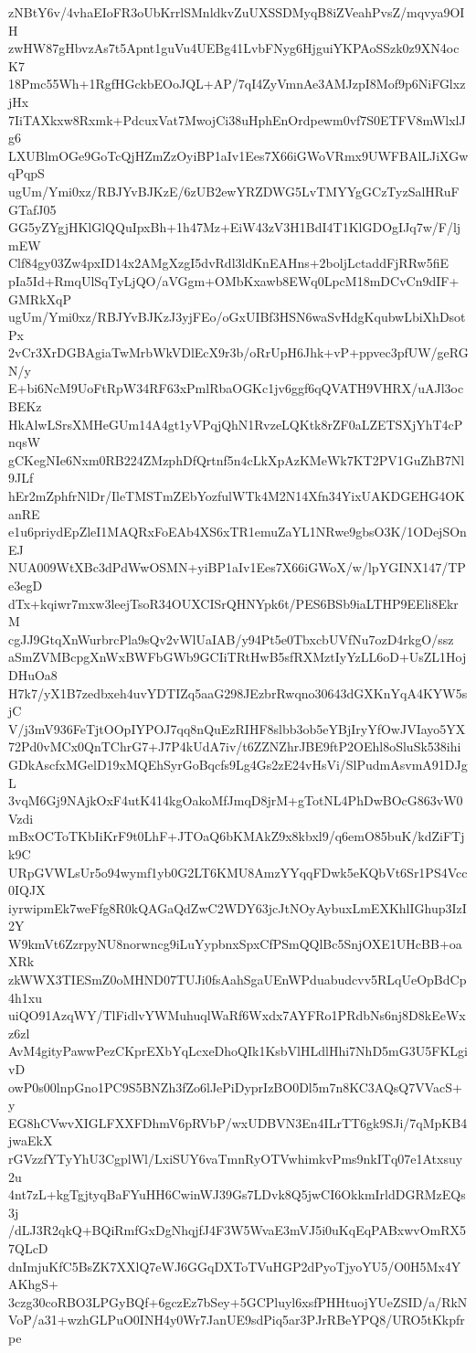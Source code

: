 zNBtY6v/4vhaEIoFR3oUbKrrlSMnldkvZuUXSSDMyqB8iZVeahPvsZ/mqvya9OIH
zwHW87gHbvzAs7t5Apnt1guVu4UEBg41LvbFNyg6HjguiYKPAoSSzk0z9XN4ocK7
18Pmc55Wh+1RgfHGckbEOoJQL+AP/7qI4ZyVmnAe3AMJzpI8Mof9p6NiFGlxzjHx
7IiTAXkxw8Rxmk+PdcuxVat7MwojCi38uHphEnOrdpewm0vf7S0ETFV8mWlxlJg6
LXUBlmOGe9GoTcQjHZmZzOyiBP1aIv1Ees7X66iGWoVRmx9UWFBAlLJiXGwqPqpS
ugUm/Ymi0xz/RBJYvBJKzE/6zUB2ewYRZDWG5LvTMYYgGCzTyzSalHRuFGTafJ05
GG5yZYgjHKlGlQQuIpxBh+1h47Mz+EiW43zV3H1BdI4T1KlGDOgIJq7w/F/ljmEW
Clf84gy03Zw4pxID14x2AMgXzgI5dvRdl3ldKnEAHns+2boljLctaddFjRRw5fiE
pIa5Id+RmqUlSqTyLjQO/aVGgm+OMbKxawb8EWq0LpcM18mDCvCn9dIF+GMRkXqP
ugUm/Ymi0xz/RBJYvBJKzJ3yjFEo/oGxUIBf3HSN6waSvHdgKqubwLbiXhDsotPx
2vCr3XrDGBAgiaTwMrbWkVDlEcX9r3b/oRrUpH6Jhk+vP+ppvec3pfUW/geRGN/y
E+bi6NcM9UoFtRpW34RF63xPmlRbaOGKc1jv6ggf6qQVATH9VHRX/uAJl3ocBEKz
HkAlwLSrsXMHeGUm14A4gt1yVPqjQhN1RvzeLQKtk8rZF0aLZETSXjYhT4cPnqsW
gCKegNIe6Nxm0RB224ZMzphDfQrtnf5n4cLkXpAzKMeWk7KT2PV1GuZhB7Nl9JLf
hEr2mZphfrNlDr/IleTMSTmZEbYozfulWTk4M2N14Xfn34YixUAKDGEHG4OKanRE
e1u6priydEpZleI1MAQRxFoEAb4XS6xTR1emuZaYL1NRwe9gbsO3K/1ODejSOnEJ
NUA009WtXBc3dPdWwOSMN+yiBP1aIv1Ees7X66iGWoX/w/lpYGINX147/TPe3egD
dTx+kqiwr7mxw3leejTsoR34OUXCISrQHNYpk6t/PES6BSb9iaLTHP9EEli8EkrM
cgJJ9GtqXnWurbrcPla9sQv2vWlUaIAB/y94Pt5e0TbxcbUVfNu7ozD4rkgO/ssz
aSmZVMBcpgXnWxBWFbGWb9GCIiTRtHwB5sfRXMztIyYzLL6oD+UsZL1HojDHuOa8
H7k7/yX1B7zedbxeh4uvYDTIZq5aaG298JEzbrRwqno30643dGXKnYqA4KYW5sjC
V/j3mV936FeTjtOOpIYPOJ7qq8nQuEzRIHF8slbb3ob5eYBjIryYfOwJVIayo5YX
72Pd0vMCx0QnTChrG7+J7P4kUdA7iv/t6ZZNZhrJBE9ftP2OEhl8oSluSk538ihi
GDkAscfxMGelD19xMQEhSyrGoBqcfs9Lg4Gs2zE24vHsVi/SlPudmAsvmA91DJgL
3vqM6Gj9NAjkOxF4utK414kgOakoMfJmqD8jrM+gTotNL4PhDwBOcG863vW0Vzdi
mBxOCToTKbIiKrF9t0LhF+JTOaQ6bKMAkZ9x8kbxl9/q6emO85buK/kdZiFTjk9C
URpGVWLsUr5o94wymf1yb0G2LT6KMU8AmzYYqqFDwk5eKQbVt6Sr1PS4Vcc0IQJX
iyrwipmEk7weFfg8R0kQAGaQdZwC2WDY63jcJtNOyAybuxLmEXKhlIGhup3IzI2Y
W9kmVt6ZzrpyNU8norwncg9iLuYypbnxSpxCfPSmQQlBc5SnjOXE1UHcBB+oaXRk
zkWWX3TIESmZ0oMHND07TUJi0fsAahSgaUEnWPduabudcvv5RLqUeOpBdCp4h1xu
uiQO91AzqWY/TlFidlvYWMuhuqlWaRf6Wxdx7AYFRo1PRdbNs6nj8D8kEeWxz6zl
AvM4gityPawwPezCKprEXbYqLcxeDhoQIk1KsbVlHLdlHhi7NhD5mG3U5FKLgivD
owP0s00lnpGno1PC9S5BNZh3fZo6lJePiDyprIzBO0Dl5m7n8KC3AQsQ7VVacS+y
EG8hCVwvXIGLFXXFDhmV6pRVbP/wxUDBVN3En4ILrTT6gk9SJi/7qMpKB4jwaEkX
rGVzzfYTyYhU3CgplWl/LxiSUY6vaTmnRyOTVwhimkvPms9nkITq07e1Atxsuy2u
4nt7zL+kgTgjtyqBaFYuHH6CwinWJ39Gs7LDvk8Q5jwCI6OkkmIrldDGRMzEQs3j
/dLJ3R2qkQ+BQiRmfGxDgNhqjfJ4F3W5WvaE3mVJ5i0uKqEqPABxwvOmRX57QLcD
dnImjuKfC5BsZK7XXlQ7eWJ6GGqDXToTVuHGP2dPyoTjyoYU5/O0H5Mx4YAKhgS+
3czg30coRBO3LPGyBQf+6gczEz7bSey+5GCPluyl6xsfPHHtuojYUeZSID/a/RkN
VoP/a31+wzhGLPuO0INH4y0Wr7JanUE9sdPiq5ar3PJrRBeYPQ8/URO5tKkpfrpe
